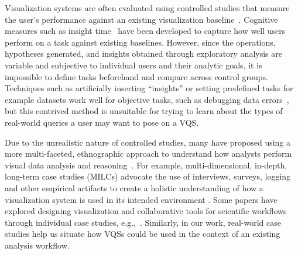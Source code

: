 \par Visualization systems are often evaluated using controlled studies that measure the user's performance against an existing visualization baseline~\cite{Plaisant2004}. Cognitive measures such as insight time~\cite{North2006,Yi2008} have been developed to capture how well users perform on a task against existing baselines. However, since the operations, hypotheses generated, and insights obtained through exploratory analysis are variable and subjective to individual users and their analytic goals, it is impossible to define tasks beforehand and compare across control groups. Techniques such as artificially inserting ``insights'' or setting predefined tasks for example datasets work well for objective tasks, such as debugging data errors~\cite{kandel2011wrangler,Patel2010}, but this contrived method is unsuitable for trying to learn about the types of real-world queries a user may want to pose on a VQS. 
\par Due to the unrealistic nature of controlled studies, many have proposed using a more multi-faceted, ethnographic approach to understand how analysts perform visual data analysis and reasoning~\cite{Plaisant2004,lam2012empirical,shneiderman2006strategies,munzner2009nested,Sedlmair2012}. For example, multi-dimensional, in-depth, long-term case studies (MILCs) advocate the use of interviews, surveys, logging and other empirical artifacts to create a holistic understanding of how a visualization system is used in its intended environment \cite{shneiderman2006strategies}. Some papers have explored designing visualization and collaborative tools for scientific workflows through individual case studies, e.g.,~\cite{Poon2008,Chen2016}. Similarly, in our work, real-world case studies help us situate how VQSs could be used in the context of an existing analysis workflow.  
